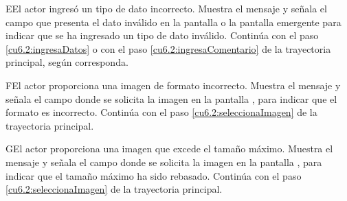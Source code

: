  \begin{UCtrayectoriaA}{E}{El actor ingresó un tipo de dato incorrecto.}
    \UCpaso[\UCsist] Muestra el mensaje  y señala el campo que presenta el dato inválido en la 
    pantalla  o la pantalla emergente  para indicar que se ha ingresado un tipo de dato inválido.
    \UCpaso[] Continúa con el paso \ref{cu6.2:ingresaDatos} o con el paso \ref{cu6.2:ingresaComentario} de la trayectoria principal, según corresponda.
 \end{UCtrayectoriaA}

 \begin{UCtrayectoriaA}{F}{El actor proporciona una imagen de formato incorrecto.}
    \UCpaso[\UCsist] Muestra el mensaje  y señala el campo donde se solicita la imagen
    en la pantalla , para indicar que el formato es incorrecto.
    \UCpaso[] Continúa con el paso \ref{cu6.2:seleccionaImagen} de la trayectoria principal.
 \end{UCtrayectoriaA}
 
 \begin{UCtrayectoriaA}{G}{El actor proporciona una imagen que excede el tamaño máximo.}
    \UCpaso[\UCsist] Muestra el mensaje  y señala el campo donde se solicita la imagen
    en la pantalla , para indicar que el tamaño máximo ha sido rebasado.
    \UCpaso[] Continúa con el paso \ref{cu6.2:seleccionaImagen} de la trayectoria principal.
 \end{UCtrayectoriaA}
 
